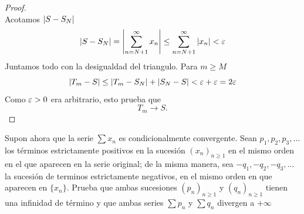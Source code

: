 \documentclass[12pt,a4paper]{article}
\begin{document}
\begin{proof}
\begin{equation*}
        \end{equation*}
        Acotamos $\abs{S-S_{N}}$
        \begin{equation*}
            \abs{S-S_{N}}=\abs{\sum_{n=N+1}^{\infty}x_{n}}\leq \sum_{n=N+1}^{\infty}\abs{x_{n}}<\varepsilon
        \end{equation*}
        Juntamos todo con la desigualdad del triangulo. Para $m\geq M$
        \begin{equation*}
            \abs{T_{m}-S}\leq\abs{T_{m}-S_{N}}+\abs{S_{N}-S}< \varepsilon+\varepsilon=2\varepsilon
        \end{equation*}
        Como $\varepsilon>0$ era arbitrario, esto prueba que
        \begin{equation*}
            T_{m}\to S.
        \end{equation*}
    \end{proof}

    \begin{ejercicio}
        Supon ahora que la serie $\sum x_{n}$ es condicionalmente
        convergente. Sean $p_{1},p_{2},p_{3},\dots$ los términos
        estrictamente positivos en la sucesión $(x_{n})_{n\geq1}$
        en el mismo orden en el que aparecen en la serie original;
        de la misma manera, sea $-q_{1},-q_{2},-q_{3},\dots$ la sucesión
        de terminos estrictamente negativos, en el mismo orden en que
        aparecen en $\{x_{n}\}$. Prueba que ambas sucesiones $(p_{n})_{n\geq1}$
        y $(q_{n})_{n\geq1}$ tienen una infinidad de término y que ambas series $\sum p_{n}$
        y $\sum q_{n}$ divergen a $+\infty$
    \end{ejercicio}
\end{document}
